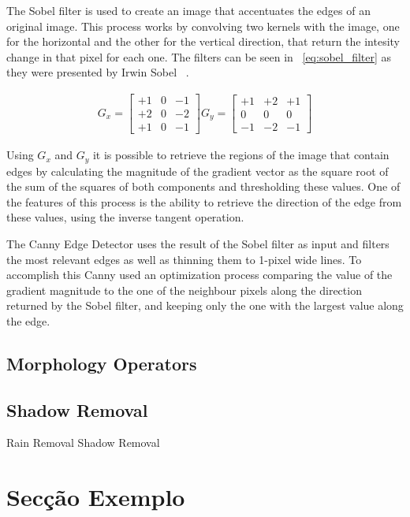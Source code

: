 The Sobel filter is used to create an image that accentuates the edges of an original image. This process works by convolving two kernels with the image, one for the horizontal and the other for the vertical direction, that return the intesity change in that pixel for each one. The filters can be seen in ~\ref{eq:sobel_filter} as they were presented by Irwin Sobel ~\cite{sobel_isotropic_1989}.

\begin{eqnarray}
\label{eq:sobel_filter}
G_{x} =
\begin{bmatrix}
+1 & 0 & -1\\ 
+2 & 0 & -2\\ 
+1 & 0 & -1
\end{bmatrix}  G_{y} = \begin{bmatrix}
+1 & +2 & +1\\ 
0 & 0 & 0\\ 
-1 & -2 & -1
\end{bmatrix}
\end{eqnarray}

Using $G_{x}$ and $G_{y}$ it is possible to retrieve the regions of the image that contain edges by calculating the magnitude of the gradient vector as the square root of the sum of the squares of both components and thresholding these values. One of the features of this process is the ability to retrieve the direction of the edge from these values, using the inverse tangent operation.

The Canny Edge Detector uses the result of the Sobel filter as input and filters the most relevant edges as well as thinning them to 1-pixel wide lines. To accomplish this Canny used an optimization process comparing the value of the gradient magnitude to the one of the neighbour pixels along the direction returned by the Sobel filter, and keeping only the one with the largest value along the edge.

\subsection{Morphology Operators}


\subsection{Shadow Removal}
Rain Removal
Shadow Removal

\section{Secção Exemplo}\label{sec:dialecto}

